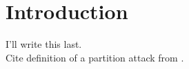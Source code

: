 \section{Introduction}
I'll write this last.\\
Cite definition of a partition attack from \cite{Apostolaki2016}.
